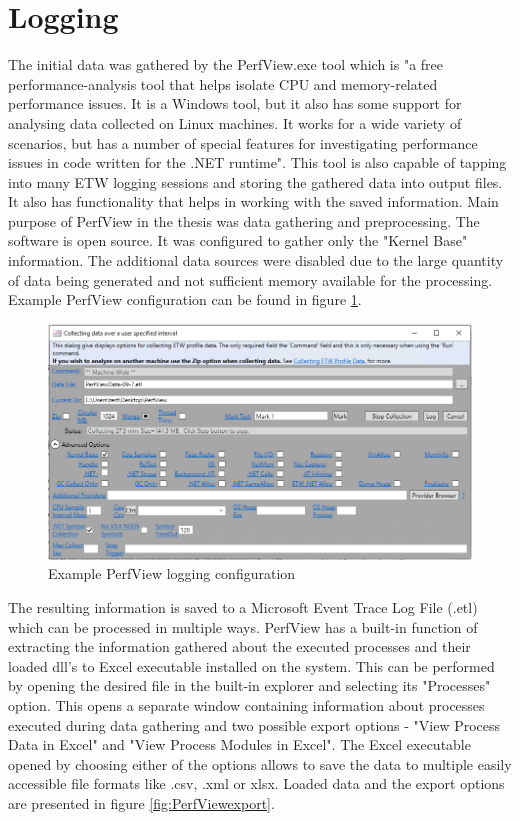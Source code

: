 \documentclass[a4paper,twoside,12pt]{book}
\begin{document}
\section{Logging}

The initial data was gathered by the PerfView.exe tool which is "a free performance-analysis 
tool that helps isolate CPU and memory-related performance issues. It is a Windows tool, 
but it also has some support for analysing data collected on Linux machines. It works for 
a wide variety of scenarios, but has a number of special features for investigating 
performance issues in code written for the .NET runtime"\cite{bib:PerfView}. This tool is also capable of 
tapping into many ETW logging sessions and storing the gathered data into output files. It also 
has functionality that helps in working with the saved information. Main purpose of PerfView 
in the thesis was data gathering and preprocessing. The software is open source.
It was configured to gather only the "Kernel Base" information. The additional data sources 
were disabled due to the large quantity of data being generated and not sufficient memory 
available for the processing. Example PerfView configuration can be found in figure 
\ref{fig:PerfViewConfig}. 

\begin{figure}
	\centering
	\includegraphics[scale=0.55]{images/perf_config}
	\caption{Example PerfView logging configuration}
	\label{fig:PerfViewConfig}
 \end{figure}

The resulting information is saved to a Microsoft Event Trace Log File (.etl) which can be 
processed in multiple ways. PerfView has a built-in function of extracting the information 
gathered about the executed processes and their loaded dll's to Excel executable installed 
on the system. This can be performed by opening the desired file in the built-in explorer 
and selecting its "Processes" option. This opens a separate window containing information 
about processes executed during data gathering and two possible export options - 
"View Process Data in Excel" and "View Process Modules in Excel". The Excel executable 
opened by choosing either of the options allows to save the data to multiple easily 
accessible file formats like .csv, .xml or xlsx. Loaded data and the export options are 
presented in figure \ref{fig:PerfViewexport}.
\end{document}
